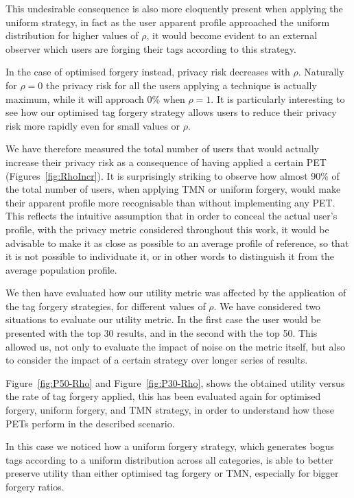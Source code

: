 This undesirable consequence is also more eloquently present when applying the uniform strategy, in fact as the user apparent profile approached the uniform distribution for higher values of $\rho$, it would become evident to an external observer which users are forging their tags according to this strategy.

In the case of optimised forgery instead, privacy risk decreases with $\rho$. Naturally for $\rho = 0$ the privacy risk for all the users applying a technique is actually maximum, while it will approach 0\% when $\rho = 1 $. It is particularly interesting to see how our optimised tag forgery strategy allows users to reduce their privacy risk  more rapidly even for small values or $ \rho $.

We have therefore measured the total number of users that would actually increase their privacy risk as a consequence of having applied a certain PET (Figures~\ref{fig:RhoIncr}). It is surprisingly striking to observe how almost 90\% of the total number of users, when applying TMN or uniform forgery, would make their apparent profile more recognisable than without implementing any PET.
This reflects the intuitive assumption that in order to conceal the actual user's profile, with the privacy metric considered throughout this work, it would be advisable to make it as close as possible to an average profile of reference, so that it is not possible to individuate it, or in other words to distinguish it from the average population profile.

We then have evaluated how our utility metric was affected by the application of the tag forgery strategies, for different values of $\rho$. We have considered two situations to evaluate our utility metric. In the first case the user would be presented with the top 30 results, and in the second with the top 50. This allowed us, not only to evaluate the impact of noise on the metric itself, but also to consider the impact of a certain strategy over longer series of results.

Figure~\ref{fig:P50-Rho} and Figure~\ref{fig:P30-Rho}, shows the obtained utility versus the rate of tag forgery applied, this has been evaluated again for optimised forgery, uniform forgery, and TMN strategy, in order to understand how these PETs perform in the described scenario.

In this case we noticed how a uniform forgery strategy, which generates bogus tags according to a uniform distribution across all categories, is able to better preserve utility than either optimised tag forgery or TMN, especially for bigger forgery ratios.

